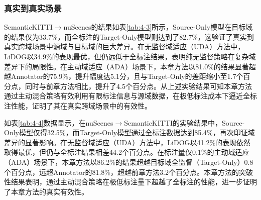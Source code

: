     \subsubsection{真实到真实场景}
    SemanticKITTI$\to$nuScenes的结果如表\ref{tab:4-3}所示，Source-Only模型在目标域的结果仅为33.7\%，而全标注的Target-Only模型则达到了82.7\%，这验证了真实到真实跨域场景中源域与目标域的巨大差异。在无监督域适应（UDA）方法中，LiDOG以34.9\%的表现最优，但仍远低于全标注结果，表明纯无监督策略在复杂域差异下的局限性。在主动域适应（ADA）场景下，本章方法以81.0\%的结果显著超越Annotator的75.9\%，提升幅度达5.1分，且与Target-Only的差距缩小至1.7个百分点，同时与前章方法相比，提升了4.5个百分点。从上述实验结果可知本章方法通过主动混合策略有效利用有限标注信息与源域数据，在极低标注成本下逼近全标注性能，证明了其在真实跨域场景中的有效性。
    
    如表\ref{tab:4-4}数据显示，在nuScenes$\to$SemanticKITTI的实验结果中，Source-Only模型仅得32.5\%，而Target-Only模型通过全标注数据达到85.4\%，再次印证域差异的显著影响。在无监督域适应（UDA）方法中，LiDOG以41.2\%的表现依然取得最优，但仍与全标注结果相差44.2个百分点。在标注量仅0.1\%的主动域适应（ADA）场景下，本章方法以86.2\%的结果超越目标域全监督（Target-Only）0.8个百分点，远超Annotator的81.8\%，超越前章方法3.2个百分点。本章方法的突破性结果表明，通过主动混合策略在极低标注量下超越了全标注的性能，进一步证明了本章方法的真实有效性。
    
